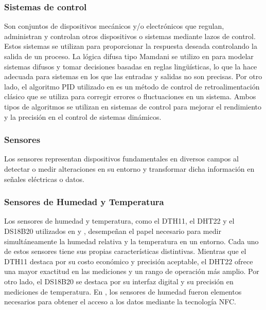 \subsubsection{Sistemas de control}
Son conjuntos de dispositivos mecánicos y/o electrónicos que regulan, administran y controlan otros dispositivos o sistemas mediante lazos de control. Estos sistemas se utilizan para proporcionar la respuesta deseada controlando la salida de un proceso. La lógica difusa tipo Mamdani se utilizo en \cite{mohammed_intelligent_nodate} \cite{widyawati_fuzzy_2022} para modelar sistemas difusos y tomar decisiones basadas en reglas lingüísticas, lo que la hace adecuada para sistemas en los que las entradas y salidas no son precisas. Por otro lado, el algoritmo PID utilizado en \cite{haiyan_intelligent_2022} es un método de control de retroalimentación clásico que se utiliza para corregir errores o fluctuaciones en un sistema. Ambos tipos de algoritmos se utilizan en sistemas de control para mejorar el rendimiento y la precisión en el control de sistemas dinámicos.

\subsubsection{Sensores}
Los sensores representan dispositivos fundamentales en diversos campos al detectar o medir alteraciones en su entorno y transformar dicha información en señales eléctricas o datos.

\subsubsection*{Sensores de Humedad y Temperatura}
Los sensores de humedad y temperatura, como el DTH11, el DHT22 y el DS18B20 utilizados en \cite{lema_holguin_implementacion_2018} \cite{alcivar_dominguez_sistema_2018} \cite{munir_intelligent_2019} \cite{krishnan_fuzzy_2020} \cite{benyezza_zoning_2021} \cite{widyawati_fuzzy_2022} y \cite{noauthor_fuzzy_2023}, desempeñan el papel necesario para medir simultáneamente la humedad relativa y la temperatura en un entorno. Cada uno de estos sensores tiene sus propias características distintivas. Mientras que el DTH11 destaca por su costo económico y precisión aceptable, el DHT22 ofrece una mayor exactitud en las mediciones y un rango de operación más amplio. Por otro lado, el DS18B20 se destaca por su interfaz digital y su precisión en mediciones de temperatura. En \cite{castillo_herrero_desarrollo_2020}, los sensores de humedad fueron elementos necesarios para obtener el acceso a los datos mediante la tecnología NFC.

